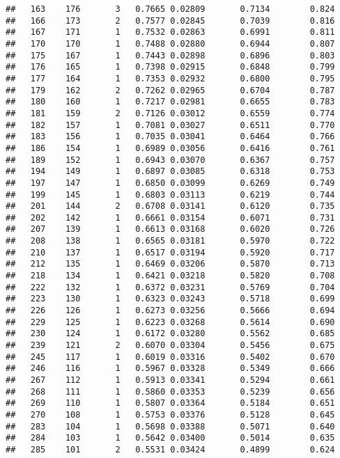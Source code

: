 \documentclass[]{article}
\begin{document}
\begin{verbatim}
##   163    176       3   0.7665 0.02809       0.7134        0.824
##   166    173       2   0.7577 0.02845       0.7039        0.816
##   167    171       1   0.7532 0.02863       0.6991        0.811
##   170    170       1   0.7488 0.02880       0.6944        0.807
##   175    167       1   0.7443 0.02898       0.6896        0.803
##   176    165       1   0.7398 0.02915       0.6848        0.799
##   177    164       1   0.7353 0.02932       0.6800        0.795
##   179    162       2   0.7262 0.02965       0.6704        0.787
##   180    160       1   0.7217 0.02981       0.6655        0.783
##   181    159       2   0.7126 0.03012       0.6559        0.774
##   182    157       1   0.7081 0.03027       0.6511        0.770
##   183    156       1   0.7035 0.03041       0.6464        0.766
##   186    154       1   0.6989 0.03056       0.6416        0.761
##   189    152       1   0.6943 0.03070       0.6367        0.757
##   194    149       1   0.6897 0.03085       0.6318        0.753
##   197    147       1   0.6850 0.03099       0.6269        0.749
##   199    145       1   0.6803 0.03113       0.6219        0.744
##   201    144       2   0.6708 0.03141       0.6120        0.735
##   202    142       1   0.6661 0.03154       0.6071        0.731
##   207    139       1   0.6613 0.03168       0.6020        0.726
##   208    138       1   0.6565 0.03181       0.5970        0.722
##   210    137       1   0.6517 0.03194       0.5920        0.717
##   212    135       1   0.6469 0.03206       0.5870        0.713
##   218    134       1   0.6421 0.03218       0.5820        0.708
##   222    132       1   0.6372 0.03231       0.5769        0.704
##   223    130       1   0.6323 0.03243       0.5718        0.699
##   226    126       1   0.6273 0.03256       0.5666        0.694
##   229    125       1   0.6223 0.03268       0.5614        0.690
##   230    124       1   0.6172 0.03280       0.5562        0.685
##   239    121       2   0.6070 0.03304       0.5456        0.675
##   245    117       1   0.6019 0.03316       0.5402        0.670
##   246    116       1   0.5967 0.03328       0.5349        0.666
##   267    112       1   0.5913 0.03341       0.5294        0.661
##   268    111       1   0.5860 0.03353       0.5239        0.656
##   269    110       1   0.5807 0.03364       0.5184        0.651
##   270    108       1   0.5753 0.03376       0.5128        0.645
##   283    104       1   0.5698 0.03388       0.5071        0.640
##   284    103       1   0.5642 0.03400       0.5014        0.635
##   285    101       2   0.5531 0.03424       0.4899        0.624

\end{verbatim}
\end{document}
